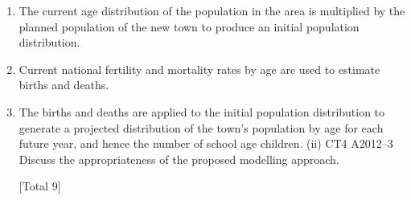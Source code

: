 \documentclass[a4paper,12pt]{article}
\begin{document}
\begin{enumerate}

[Total 6]5
For a particular investigation the hazard of mortalitY_is assumed to take the form:
h ( t ) = A + Bt
where A and B are constants and t represents time.
For each life i in the investigation (i = 1, ..., n) information was collected on the
length of time the life was observed t i and whether the life exited due to death ( δ i = 1
if the life died, 0 otherwise).
(i)
Show that the likelihood of the data is given by:
n
L = ∏ ( A + Bt i ) δ i exp[ − At i −
i = 1
6
1 2
Bt i ] .
2

(ii) Derive two simultaneous equations from which the maximum likelihood
estimates of the parameters A and B can be calculated.

[Total 6]
(i) List the advantages and disadvantages of using models in actuarial work.

A new town is planned in a currently rural area. A model is to be developed to
recommend the number and size of schools required in the new town. The proposed
modelling approach is as follows:
\item The current age distribution of the population in the area is multiplied by the
planned population of the new town to produce an initial population distribution.
\item Current national fertility and mortality rates by age are used to estimate births and
deaths.
\item The births and deaths are applied to the initial population distribution to generate
a projected distribution of the town’s population by age for each future year, and
hence the number of school age children.
(ii)
CT4 A2012–3
Discuss the appropriateness of the proposed modelling approach.

[Total 9]


\end{enumerate}
\end{document}
